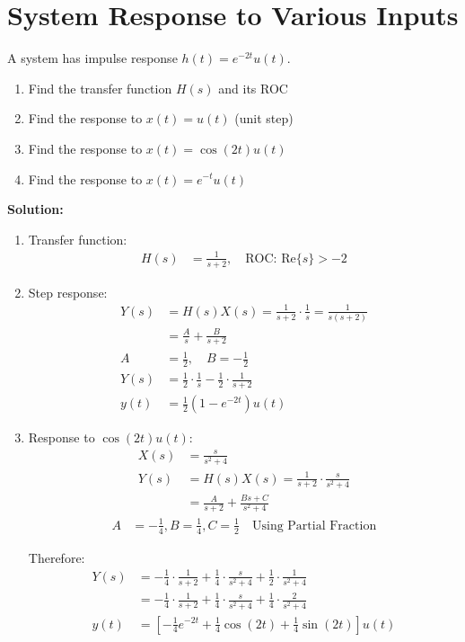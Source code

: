 \documentclass{article}
\begin{document}
\section{System Response to Various Inputs}
A system has impulse response $h(t) = e^{-2t}u(t)$.
\begin{enumerate}[label=(\alph*)]
    \item Find the transfer function $H(s)$ and its ROC
    \item Find the response to $x(t) = u(t)$ (unit step)
    \item Find the response to $x(t) = \cos(2t)u(t)$
    \item Find the response to $x(t) = e^{-t}u(t)$
\end{enumerate}

\textbf{Solution:}
\begin{enumerate}[label=(\alph*)]
    \item Transfer function:
    \begin{align*}
        H(s) &= \frac{1}{s + 2}, \quad \text{ROC: } \text{Re}\{s\} > -2
    \end{align*}
    
    \item Step response:
    \begin{align*}
        Y(s) &= H(s)X(s) = \frac{1}{s + 2} \cdot \frac{1}{s} = \frac{1}{s(s + 2)} \\
        &= \frac{A}{s} + \frac{B}{s + 2} \\
        A &=  \frac{1}{2}, \quad B = -\frac{1}{2} \\
        Y(s) &= \frac{1}{2} \cdot \frac{1}{s} - \frac{1}{2} \cdot \frac{1}{s + 2} \\
        y(t) &= \frac{1}{2}(1 - e^{-2t})u(t)
    \end{align*}
    
    \item Response to $\cos(2t)u(t)$:
    \begin{align*}
        X(s) &= \frac{s}{s^2 + 4} \\
        Y(s) &= H(s)X(s) = \frac{1}{s + 2} \cdot \frac{s}{s^2 + 4} \\
        &= \frac{A}{s + 2} + \frac{Bs + C}{s^2 + 4}
    \end{align*}
    \begin{align*}
        A &=  -\frac{1}{4}, B = \frac{1}{4}, C = \frac{1}{2} \quad \text{Using Partial Fraction}
    \end{align*}
    
    Therefore:
    \begin{align*}
        Y(s) &= -\frac{1}{4} \cdot \frac{1}{s + 2} + \frac{1}{4} \cdot \frac{s}{s^2 + 4} + \frac{1}{2} \cdot \frac{1}{s^2 + 4} \\
        &= -\frac{1}{4} \cdot \frac{1}{s + 2} + \frac{1}{4} \cdot \frac{s}{s^2 + 4} + \frac{1}{4} \cdot \frac{2}{s^2 + 4} \\
        y(t) &= \left[-\frac{1}{4}e^{-2t} + \frac{1}{4}\cos(2t) + \frac{1}{4}\sin(2t)\right]u(t)
    \end{align*}
    

\end{enumerate}
\end{document}
